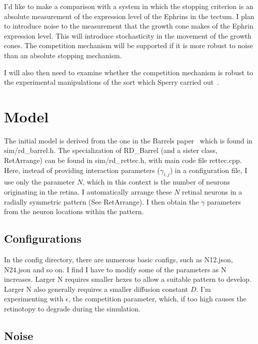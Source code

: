 \documentclass[11pt, a4paper]{article}
\newcommand{\code}[1]{\textsf{#1}}
\begin{document}
I'd like to make a comparison with a system in which the stopping criterion is
an absolute measurement of the expression level of the Ephrins in the
tectum. I plan to introduce noise to the measurement that the growth cone
makes of the Ephrin expression level. This will introduce stochasticity in the
movement of the growth cones. The competition mechanism will be supported if
it is more robust to noise than an absolute stopping mechanism.

I will also then need to examine whether the competition mechanism is robust
to the experimental manipulations of the sort which Sperry carried
out~\cite{sperry_chemoaffinity_1963,goodhill_retinotectal_1999,goodhill_development_2005}.

\section{Model}

The initial model is derived from the one in the Barrels
paper~\cite{james_modelling_2020} which is found
in \code{sim/rd\_barrel.h}. The specialization of \code{RD\_Barrel} (and a
sister class, \code{RetArrange}) can be found in \code{sim/rd\_rettec.h}, with
main code file \code{rettec.cpp}. Here, instead of providing interaction
parameters ($\gamma_{i,j}$) in a configuration file, I use only the parameter
$N$, which in this context is the number of neurons originating in the
retina. I automatically arrange these $N$ retinal neurons in a radially
symmetric pattern (See \code{RetArrange}). I then obtain the $\gamma$
parameters from the neuron locations within the pattern.

\subsection{Configurations}

In the config directory, there are numerous basic configs, such as N12.json,
N24.json and so on. I find I have to modify some of the parameters as N
increases. Larger N requires smaller hexes to allow a suitable pattern to
develop. Larger N also generally requires a smaller diffusion constant
$D$. I'm experimenting with $\epsilon$, the competition parameter, which, if
too high causes the retinotopy to degrade during the simulation.

\subsection{Noise}
\end{document}
